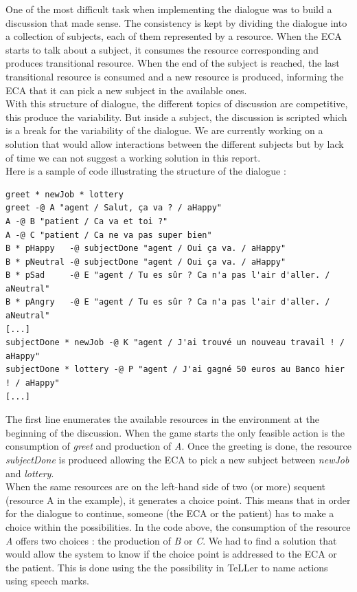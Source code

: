 \documentclass[11pt]{article}
\begin{document}
One of the most difficult task when implementing the dialogue was to build a discussion that made sense. The consistency is kept by dividing the dialogue into a collection of subjects, each of them represented by a resource. When the ECA starts to talk about a subject, it consumes the resource corresponding and produces transitional resource. When the end of the subject is reached, the last transitional resource is consumed and a new resource is produced, informing the ECA that it can pick a new subject in the available ones.\\

With this structure of dialogue, the different topics of discussion are competitive, this produce the variability. But inside a subject, the discussion is scripted which is a break for the variability of the dialogue. We are currently working on a solution that would allow interactions between the different subjects but by lack of time we can not suggest a working solution in this report. \\

Here is a sample of code illustrating the structure of the dialogue :
\begin{lstlisting}[basicstyle=\small]
greet * newJob * lottery
greet -@ A "agent / Salut, ça va ? / aHappy"
A -@ B "patient / Ca va et toi ?"
A -@ C "patient / Ca ne va pas super bien"
B * pHappy   -@ subjectDone "agent / Oui ça va. / aHappy" 
B * pNeutral -@ subjectDone "agent / Oui ça va. / aHappy" 
B * pSad     -@ E "agent / Tu es sûr ? Ca n'a pas l'air d'aller. / aNeutral"
B * pAngry   -@ E "agent / Tu es sûr ? Ca n'a pas l'air d'aller. / aNeutral"
[...]
subjectDone * newJob -@ K "agent / J'ai trouvé un nouveau travail ! / aHappy"
subjectDone * lottery -@ P "agent / J'ai gagné 50 euros au Banco hier ! / aHappy"
[...]
\end{lstlisting}
The first line enumerates the available resources in the environment at the beginning of the discussion. When the game starts the only feasible action is the consumption of \textit{greet} and production of \textit{A}. Once the greeting is done, the resource \textit{subjectDone} is produced allowing the ECA to pick a new subject between \textit{newJob} and \textit{lottery}.\\

When the same resources are on the left-hand side of two (or more) sequent (resource A in the example), it generates a choice point. This means that in order for the dialogue to continue, someone (the ECA or the patient) has to make a choice within the possibilities. In the code above, the consumption of the resource \textit{A} offers two choices : the production of \textit{B} or \textit{C}. We had to find a solution that would allow the system to know if the choice point is addressed to the ECA or the patient. This is done using the the possibility in TeLLer to name actions using speech marks.\\
\end{document}
